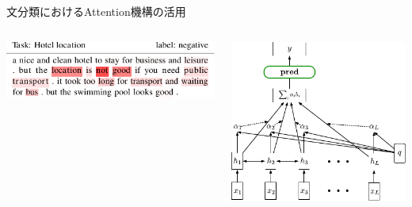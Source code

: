 \begin{frame}{文分類におけるAttention機構の活用}
\begin{columns}[onlytextwidth]
\begin{column}{0.58\linewidth}
\vspace*{-8pt}
\includegraphics[width=\linewidth]{fig/attention.pdf}
\end{column}
\begin{column}{0.4\linewidth}
\vspace*{-8pt}
\includegraphics[width=\linewidth]{fig/attention_classifier.pdf}
\end{column}
\end{columns}
\end{frame}

